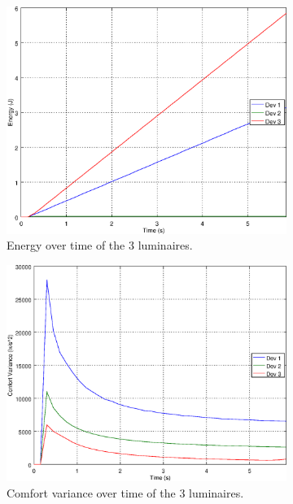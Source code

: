 \begin{figure}[ht]
    \centering
    \begin{subfigure}[t]{0.3\textwidth}
    \centering
    \includegraphics[width=.95\textwidth]{img/e_open_o101}
    \caption{Energy over time of the 3 luminaires.}
    \label{fig:e_open_o101}
    \end{subfigure}
    \begin{subfigure}[t]{0.3\textwidth}
    \centering
    \includegraphics[width=.95\textwidth]{img/f_open_o101}
    \caption{Comfort variance over time of the 3 luminaires.}
    \label{fig:f_open_o101}
    \end{subfigure}
    \begin{subfigure}[t]{0.3\textwidth}

\end{subfigure}
\end{figure}

